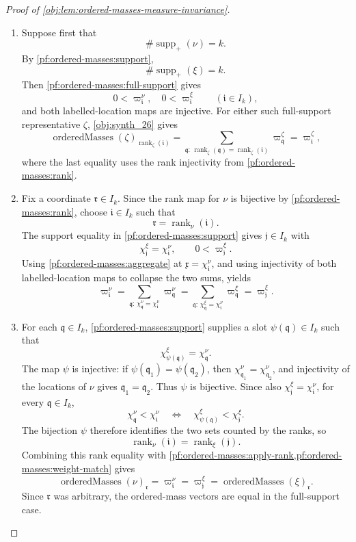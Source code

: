 \documentclass[11pt]{article}
\begin{document}
\begin{proof}[Proof of \cref{obj:lem:ordered-masses-measure-invariance}]
\begin{enumerate}
\item\label{pf:ordered-masses:apply-rank}
Suppose first that
\[
\#\operatorname{supp}_+(\nu)=k .
\]
By \cref{pf:ordered-masses:support},
\[
\#\operatorname{supp}_+(\xi)=k .
\]
Then \cref{pf:ordered-masses:full-support} gives
\[
0<\varpi^\nu_{\mathfrak i},
\quad
0<\varpi^\xi_{\mathfrak i}
\qquad(\mathfrak i\in I_k),
\]
and both labelled-location maps are injective.  For either such full-support representative \(\zeta\), \cref{obj:synth_26} gives
\[
\operatorname{orderedMasses}(\zeta)_{\operatorname{rank}_{\zeta}(\mathfrak i)}
=
\sum_{\mathfrak q:\,
\operatorname{rank}_{\zeta}(\mathfrak q)=\operatorname{rank}_{\zeta}(\mathfrak i)}
\varpi^\zeta_{\mathfrak q}
=
\varpi^\zeta_{\mathfrak i},
\]
where the last equality uses the rank injectivity from \cref{pf:ordered-masses:rank}.

\item\label{pf:ordered-masses:weight-match}
Fix a coordinate \(\mathfrak r\in I_k\).  Since the rank map for \(\nu\) is bijective by \cref{pf:ordered-masses:rank}, choose \(\mathfrak i\in I_k\) such that
\[
\mathfrak r=\operatorname{rank}_{\nu}(\mathfrak i).
\]
The support equality in \cref{pf:ordered-masses:support} gives \(\mathfrak j\in I_k\) with
\[
\chi^\xi_{\mathfrak j}=\chi^\nu_{\mathfrak i},
\qquad
0<\varpi^\xi_{\mathfrak j}.
\]
Using \cref{pf:ordered-masses:aggregate} at \(\mathfrak x=\chi^\nu_{\mathfrak i}\), and using injectivity of both labelled-location maps to collapse the two sums, yields
\[
\varpi^\nu_{\mathfrak i}
=
\sum_{\mathfrak q:\,\chi^\nu_{\mathfrak q}=\chi^\nu_{\mathfrak i}}
\varpi^\nu_{\mathfrak q}
=
\sum_{\mathfrak q:\,\chi^\xi_{\mathfrak q}=\chi^\nu_{\mathfrak i}}
\varpi^\xi_{\mathfrak q}
=
\varpi^\xi_{\mathfrak j}.
\]

\item\label{pf:ordered-masses:rank-match}
For each \(\mathfrak q\in I_k\), \cref{pf:ordered-masses:support} supplies a slot
\(\psi(\mathfrak q)\in I_k\) such that
\[
\chi^\xi_{\psi(\mathfrak q)}=\chi^\nu_{\mathfrak q}.
\]
The map \(\psi\) is injective: if \(\psi(\mathfrak q_1)=\psi(\mathfrak q_2)\), then
\(\chi^\nu_{\mathfrak q_1}=\chi^\nu_{\mathfrak q_2}\), and injectivity of the locations of \(\nu\) gives
\(\mathfrak q_1=\mathfrak q_2\).  Thus \(\psi\) is bijective.  Since also
\(\chi^\xi_{\mathfrak j}=\chi^\nu_{\mathfrak i}\), for every \(\mathfrak q\in I_k\),
\[
\chi^\nu_{\mathfrak q}<\chi^\nu_{\mathfrak i}
\quad\Longleftrightarrow\quad
\chi^\xi_{\psi(\mathfrak q)}<\chi^\xi_{\mathfrak j}.
\]
The bijection \(\psi\) therefore identifies the two sets counted by the ranks, so
\[
\operatorname{rank}_{\nu}(\mathfrak i)
=
\operatorname{rank}_{\xi}(\mathfrak j).
\]
Combining this rank equality with \cref{pf:ordered-masses:apply-rank,pf:ordered-masses:weight-match} gives
\[
\operatorname{orderedMasses}(\nu)_{\mathfrak r}
=
\varpi^\nu_{\mathfrak i}
=
\varpi^\xi_{\mathfrak j}
=
\operatorname{orderedMasses}(\xi)_{\mathfrak r}.
\]
Since \(\mathfrak r\) was arbitrary, the ordered-mass vectors are equal in the full-support case.


\end{enumerate}
\end{proof}
\end{document}
